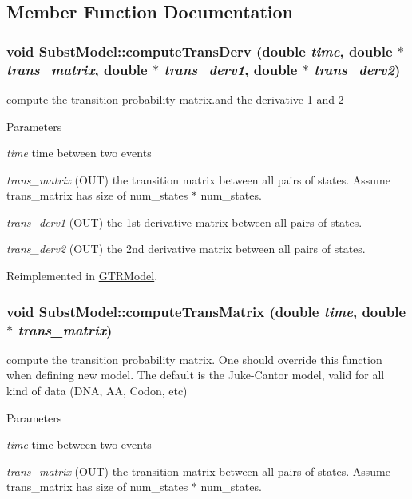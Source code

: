 \subsection{Member Function Documentation}
\hypertarget{classSubstModel_ada88db5c6befc33de5ddb590667ba865}{
\subsubsection[{computeTransDerv}]{\setlength{\rightskip}{0pt plus 5cm}void SubstModel::computeTransDerv (double {\em time}, \/  double $\ast$ {\em trans\_\-matrix}, \/  double $\ast$ {\em trans\_\-derv1}, \/  double $\ast$ {\em trans\_\-derv2})}}
\label{classSubstModel_ada88db5c6befc33de5ddb590667ba865}
compute the transition probability matrix.and the derivative 1 and 2 
\begin{DoxyParams}{Parameters}
\item[{\em time}]time between two events \item[{\em trans\_\-matrix}](OUT) the transition matrix between all pairs of states. Assume trans\_\-matrix has size of num\_\-states $\ast$ num\_\-states. \item[{\em trans\_\-derv1}](OUT) the 1st derivative matrix between all pairs of states. \item[{\em trans\_\-derv2}](OUT) the 2nd derivative matrix between all pairs of states. \end{DoxyParams}


Reimplemented in \hyperlink{classGTRModel_a9f6c7532d57b0e41d95dd95c5972cf5b}{GTRModel}.\hypertarget{classSubstModel_a83997a2aaea95f2c994d88a9d1cb190e}{
\subsubsection[{computeTransMatrix}]{\setlength{\rightskip}{0pt plus 5cm}void SubstModel::computeTransMatrix (double {\em time}, \/  double $\ast$ {\em trans\_\-matrix})}}
\label{classSubstModel_a83997a2aaea95f2c994d88a9d1cb190e}
compute the transition probability matrix. One should override this function when defining new model. The default is the Juke-\/Cantor model, valid for all kind of data (DNA, AA, Codon, etc) 
\begin{DoxyParams}{Parameters}
\item[{\em time}]time between two events \item[{\em trans\_\-matrix}](OUT) the transition matrix between all pairs of states. Assume trans\_\-matrix has size of num\_\-states $\ast$ num\_\-states. \end{DoxyParams}


